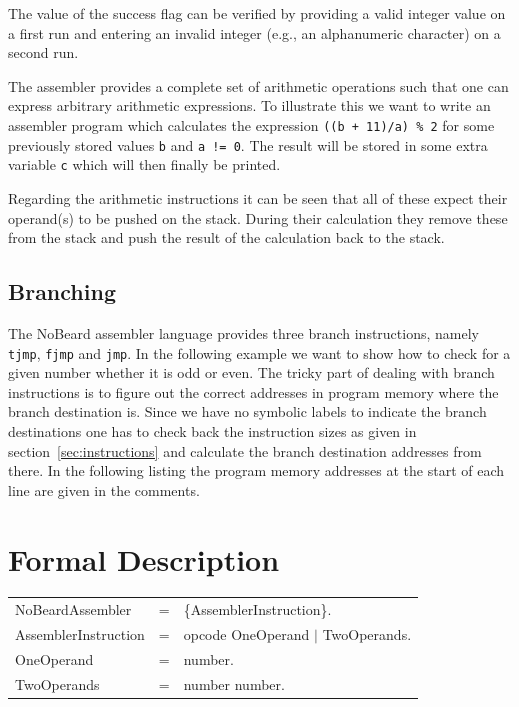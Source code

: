 \documentclass[11pt]{report}
\newcommand{\leongage}{NoBeard}
\newenvironment{grammar}[2] %
	{
		\newcommand{\completerule}[2]{##1 & = & ##2.\\}
		\newcommand{\startrule}[2]{##1 & = & ##2\\}
		\newcommand{\alternativerule}[1]{ & $|$ & ##1\\}
		\newcommand{\alternativeend}[1]{ & $|$ & ##1.\\}
		\newcommand{\finishrule}[1]{ & & ##1.\\}
		\begin{tabular}{p{#1} c p{#2}}
	}
	{	\end{tabular}
	}
\begin{document}

The value of the success flag can be verified by providing a valid integer value on a first run and entering an invalid integer (e.g., an alphanumeric character) on a second run.

The assembler provides a complete set of arithmetic operations such that one can express arbitrary arithmetic expressions. To illustrate this we want to write an assembler program which calculates the expression \lstinline$((b + 11)/a) % 2$
for some previously stored values \lstinline$b$ and \lstinline$a != 0$. The result will be stored in some extra variable \lstinline$c$ which will then finally be printed.



Regarding the arithmetic instructions it can be seen that all of these expect their operand(s) to be pushed on the stack. During their calculation they remove these from the stack and push the result of the calculation back to the stack.

\subsection{Branching}
The \leongage{} assembler language provides three branch instructions, namely \lstinline$tjmp$, \lstinline$fjmp$ and \lstinline$jmp$. In the following example we want to show how to check for a given number whether it is odd or even. The tricky part of dealing with branch instructions is to figure out the correct addresses in program memory where the branch destination is. Since we have no symbolic labels to indicate the branch destinations one has to check back the instruction sizes as given in section~\ref{sec:instructions} and calculate the branch destination addresses from there. In the following listing the program memory addresses at the start of each line are given in the comments.


\section{Formal Description}

\begin{grammar}{}{}
	\completerule{NoBeardAssembler}{\{AssemblerInstruction\}}
	\completerule{AssemblerInstruction}{opcode OneOperand $|$ TwoOperands}
	\completerule{OneOperand}{number}
	\completerule{TwoOperands}{number number}
\end{grammar}
\end{document}
